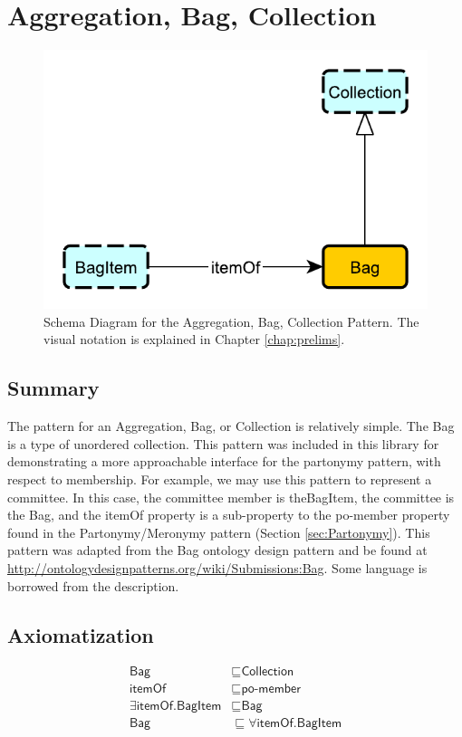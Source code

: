 \section{Aggregation, Bag, Collection}
\label{sec:Aggregation,}
\begin{figure}[h!]
\begin{center}
\includegraphics[width=.8\textwidth]{figures/aggregation}
\end{center}
\caption{Schema Diagram for the Aggregation, Bag, Collection Pattern. The visual notation is explained in Chapter \ref{chap:prelims}.}
\label{fig:Aggregation,}
\end{figure}
\subsection{Summary}
\label{sum:Aggregation,}
The pattern for an Aggregation, Bag, or Collection is relatively simple. The Bag is a type of unordered collection. This pattern was included in this library for demonstrating a more approachable interface for the partonymy pattern, with respect to membership. For example, we may use this pattern to represent a committee. In this case, the committee member is the\textsf{BagItem}, the committee is the \textsf{Bag}, and the \textsf{itemOf} property is a sub-property to the \textsf{po-member} property found in the Partonymy/Meronymy pattern (Section \ref{sec:Partonymy}). This pattern was adapted from the Bag ontology design pattern and be found at \url{http://ontologydesignpatterns.org/wiki/Submissions:Bag}. Some language is borrowed from the description.

\subsection{Axiomatization}
\label{axs:Aggregation,}
\begin{align}
\textsf{Bag} &\sqsubseteq \textsf{Collection} \\
\textsf{itemOf} &\sqsubseteq \textsf{po-member} \\
\exists\textsf{itemOf.BagItem} &\sqsubseteq \textsf{Bag} \\
\textsf{Bag} &\sqsubseteq \forall\textsf{itemOf.BagItem} \\
\end{align}


